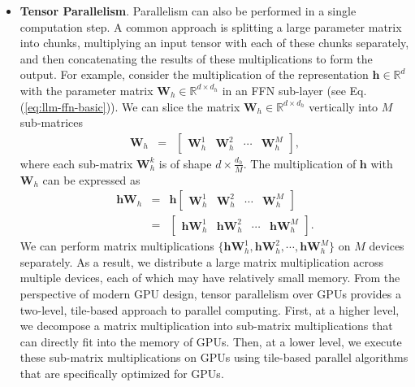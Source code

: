\begin{itemize}
\item \vspace{0.3em} \textbf{Tensor Parallelism}. Parallelism can also be performed in a single computation step. A common approach is splitting a large parameter matrix into chunks, multiplying an input tensor with each of these chunks separately, and then concatenating the results of these multiplications to form the output. For example, consider the multiplication of the representation $\mathbf{h} \in \mathbb{R}^{d}$ with the parameter matrix $\mathbf{W}_h \in \mathbb{R}^{d \times d_h}$ in an FFN sub-layer (see Eq. (\ref{eq:llm-ffn-basic})). We can slice the matrix $\mathbf{W}_h \in \mathbb{R}^{d \times d_h}$ vertically into $M$ sub-matrices
    \begin{eqnarray}
    \mathbf{W}_h & = & \begin{bmatrix} \mathbf{W}_h^{1} & \mathbf{W}_h^{2} & \cdots & \mathbf{W}_h^{M} \end{bmatrix},
    \end{eqnarray}
    \noindent where each sub-matrix $\mathbf{W}_h^{k}$ is of shape $d \times \frac{d_h}{M}$. The multiplication of $\mathbf{h}$ with $\mathbf{W}_h$ can be expressed as
    \begin{eqnarray}
    \mathbf{h} \mathbf{W}_h & = & \mathbf{h} \begin{bmatrix} \mathbf{W}_h^{1} & \mathbf{W}_h^{2} & \cdots & \mathbf{W}_h^{M} \end{bmatrix} \nonumber \\
                            & = & \begin{bmatrix} \mathbf{h} \mathbf{W}_h^{1} & \mathbf{h} \mathbf{W}_h^{2} & \cdots & \mathbf{h} \mathbf{W}_h^{M} \end{bmatrix}.
    \end{eqnarray}
    \noindent We can perform matrix multiplications $\{\mathbf{h} \mathbf{W}_h^{1}, \mathbf{h} \mathbf{W}_h^{2}, \cdots ,\mathbf{h} \mathbf{W}_h^{M} \}$ on $M$ devices separately. As a result, we distribute a large matrix multiplication across multiple devices, each of which may have relatively small memory. From the perspective of modern GPU design, tensor parallelism over GPUs provides a two-level, tile-based approach to parallel computing. First, at a higher level, we decompose a matrix multiplication into sub-matrix multiplications that can directly fit into the memory of GPUs. Then, at a lower level, we execute these sub-matrix multiplications on GPUs using tile-based parallel algorithms that are specifically optimized for GPUs.


\end{itemize}
